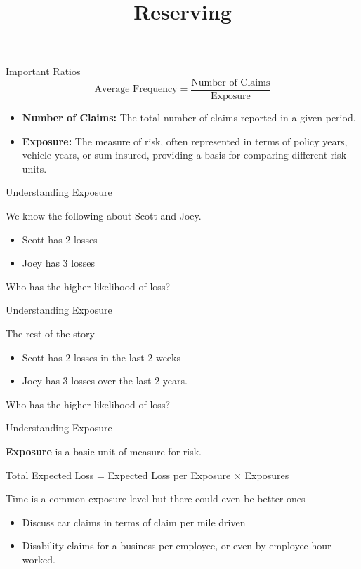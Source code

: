 \documentclass[compress,mathserif]{beamer}
\title{Reserving}
\author{}
\institute[Stat 346]{Stat 346 - Short-term Actuarial Math}
\date[ BYU]{}
\begin{document}
\begin{frame}
 \titlepage
\end{frame}

\begin{frame}{Important Ratios}
    \[ \text{Average Frequency} = \frac{\text{Number of Claims}}{\text{Exposure}} \]
    \begin{itemize}
        \item \textbf{Number of Claims:} The total number of claims reported in a given period.
        \item \textbf{Exposure:} The measure of risk, often represented in terms of policy years, vehicle years, or sum insured, providing a basis for comparing different risk units.
    \end{itemize}
\end{frame}

\begin{frame}{Understanding Exposure}

We know the following about Scott and Joey.

\begin{itemize}
\item Scott has 2 losses
\item Joey has 3 losses
\end{itemize}

Who has the higher likelihood of loss?

\end{frame}

\begin{frame}{Understanding Exposure}

The rest of the story
\begin{itemize}
\item Scott has 2 losses in the last 2 weeks
\item Joey has 3 losses over the last 2 years. 
\end{itemize}

Who has the higher likelihood of loss?

\end{frame}

\begin{frame}{Understanding Exposure}

\textbf{Exposure} is a basic unit of measure for risk. 

\vspace{1 mm}
Total Expected Loss = Expected Loss per Exposure $\times$ Exposures
\vspace{1 mm}

Time is a common exposure level but there could even be better ones
\begin{itemize}
\item Discuss car claims in terms of claim per mile driven
\item Disability claims for a business per employee,  or even by employee hour worked. 
\end{itemize}


\end{frame}
\end{document}
